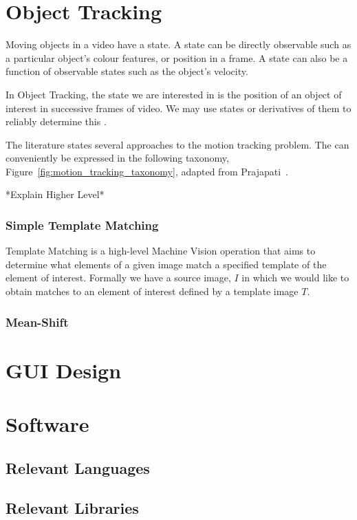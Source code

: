 \section{Object Tracking}
Moving objects in a video have a state. A state can be directly observable such as a
particular object's colour features, or position in a frame. A state can also be a function
of observable states such as the object's velocity.

In Object Tracking, the state we are interested in is the position of an object
of interest in successive frames of video. We may use states or derivatives of
them to reliably determine this \cite{Forsyth2012}.

The literature states several approaches to the motion tracking problem. The can
conveniently be expressed in the following taxonomy, Figure~\ref{fig:motion_tracking_taxonomy},
adapted from Prajapati~\cite{Prajapati2015}.


*Explain Higher Level*

\subsubsection{Simple Template Matching}
Template Matching is a high-level Machine Vision operation that aims to determine
what elements of a given image match a specified template of the element of
interest.
Formally we have a source image, $I$ in which we would like to obtain matches to
an element of interest defined by a template image $T$.

\subsubsection{Mean-Shift}\label{literature_review_mean_shift}


\section{GUI Design}

\section{Software}

\subsection{Relevant Languages}

\subsection{Relevant Libraries}




